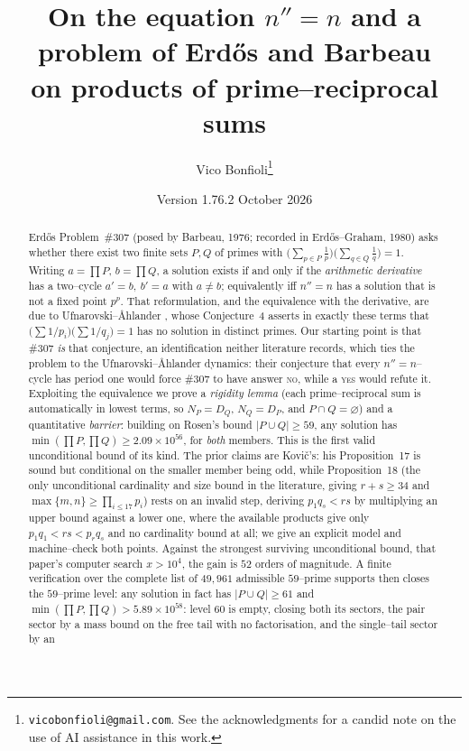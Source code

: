 \documentclass[11pt]{article}
\title{On the equation $n''=n$ and a problem of Erd\H{o}s and Barbeau \\
       on products of prime--reciprocal sums}
\author{Vico Bonfioli\thanks{\texttt{vicobonfioli@gmail.com}.
  See the acknowledgments for a candid note on the use of AI assistance in this work.}}
\date{Version 1.76.2\quad 18 October 2026}
\theoremstyle{definition}
\begin{document}
\maketitle

\begin{abstract}
Erd\H{o}s Problem~\#307 (posed by Barbeau, 1976; recorded in Erd\H{o}s--Graham, 1980) asks
whether there exist two finite sets $P,Q$ of primes with
$\bigl(\sum_{p\in P}\tfrac1p\bigr)\bigl(\sum_{q\in Q}\tfrac1q\bigr)=1$.
Writing $a=\prod P$, $b=\prod Q$, a solution exists if and only if the \emph{arithmetic derivative}
has a two--cycle $a'=b,\ b'=a$ with $a\neq b$; equivalently iff $n''=n$ has a solution that is not a
fixed point $p^{p}$. That reformulation, and the equivalence with the derivative, are due to
Ufnarovski--\AA hlander \cite{UfnarovskiAhlander2003}, whose Conjecture~4 asserts in exactly these
terms that $\bigl(\sum1/p_i\bigr)\bigl(\sum1/q_j\bigr)=1$ has no solution in distinct primes. Our
starting point is that \#307 \emph{is} that conjecture, an identification neither literature
records, which ties the problem to the Ufnarovski--\AA hlander dynamics: their conjecture that
every $n''=n$--cycle has period one would force \#307 to have answer \textsc{no}, while a
\textsc{yes} would refute it. Exploiting the equivalence we prove a \emph{rigidity lemma} (each prime--reciprocal
sum is automatically in lowest terms, so $N_P=D_Q$, $N_Q=D_P$, and $P\cap Q=\varnothing$) and a
quantitative \emph{barrier}: building on Rosen's bound $|P\cup Q|\ge 59$, any solution has
$\min(\prod P,\prod Q)\ge 2.09\times10^{56}$, for \emph{both} members. This is the first valid
unconditional bound of its kind. The prior claims are Kovi\v{c}'s: his Proposition~17 is sound but
conditional on the smaller member being odd, while Proposition~18 (the only unconditional
cardinality and size bound in the literature, giving $r+s\ge34$ and
$\max\{m,n\}\ge\prod_{i\le17}p_i$) rests on an invalid step, deriving $p_1q_s<rs$ by multiplying
an upper bound against a lower one, where the available products give only $p_1q_1<rs<p_rq_s$ and no
cardinality bound at all; we give an explicit model and machine--check both points. Against the
strongest surviving unconditional bound, that paper's computer search $x>10^4$, the gain is $52$
orders of magnitude. A finite verification over the complete list of
$49{,}961$ admissible $59$--prime supports then closes the $59$--prime level: any solution in fact
has $|P\cup Q|\ge 61$ and $\min(\prod P,\prod Q)>5.89\times10^{58}$: level $60$ is empty, closing both its
sectors, the pair sector by a mass bound on the free tail with no factorisation, and the single--tail sector by an

\end{abstract}
\end{document}
